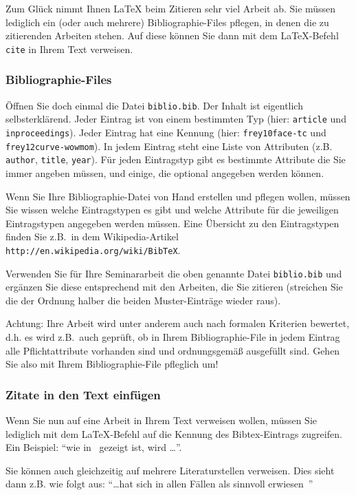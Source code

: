 \documentclass[a4paper,twoside]{IEEEtran}
\begin{document}
Zum Glück nimmt Ihnen LaTeX beim Zitieren sehr viel Arbeit ab. Sie müssen lediglich ein (oder auch mehrere) Bibliographie-Files pflegen, in denen die zu zitierenden Arbeiten stehen. Auf diese können Sie dann mit dem LaTeX-Befehl \texttt{cite} in Ihrem Text verweisen.

\subsubsection{Bibliographie-Files}

Öffnen Sie doch einmal die Datei \texttt{biblio.bib}. Der Inhalt ist eigentlich selbsterklärend. Jeder Eintrag ist von einem bestimmten Typ (hier: \texttt{article} und \texttt{inproceedings}). Jeder Eintrag hat eine Kennung (hier: \texttt{frey10face-tc} und \texttt{frey12curve-wowmom}). In jedem Eintrag steht eine Liste von Attributen (z.B. \texttt{author}, \texttt{title}, \texttt{year}). Für jeden Eintragstyp gibt es bestimmte Attribute die Sie immer angeben müssen, und einige, die optional angegeben werden können.

Wenn Sie Ihre Bibliographie-Datei von Hand erstellen und pflegen wollen, müssen Sie wissen welche Eintragstypen es gibt und welche Attribute für die jeweiligen Eintragstypen angegeben werden müssen. Eine Übersicht zu den Eintragstypen finden Sie z.B.\ in dem Wikipedia-Artikel \texttt{http://en.wikipedia.org/wiki/BibTeX}.

Verwenden Sie für Ihre Seminararbeit die oben genannte Datei \texttt{biblio.bib} und ergänzen Sie diese entsprechend mit den Arbeiten, die Sie zitieren (streichen Sie die der Ordnung halber die beiden Muster-Einträge wieder raus).

Achtung: Ihre Arbeit wird unter anderem auch nach formalen Kriterien bewertet, d.h. es wird z.B.\ auch geprüft, ob in Ihrem Bibliographie-File in jedem Eintrag alle Pflichtattribute vorhanden sind und ordnungsgemäß ausgefüllt sind. Gehen Sie also mit Ihrem Bibliographie-File pfleglich um!

\subsubsection{Zitate in den Text einfügen}

Wenn Sie nun auf eine Arbeit in Ihrem Text verweisen wollen, müssen Sie lediglich mit dem LaTeX-Befehl auf die Kennung des Bibtex-Eintrags zugreifen. Ein Beispiel: "`wie in~\cite{frey10face-tc} gezeigt ist, wird \dots"'.

Sie können auch gleichzeitig auf mehrere Literaturstellen verweisen. Dies sieht dann z.B. wie folgt aus: "`\dots hat sich in allen Fällen als sinnvoll erwiesen~\cite{frey10face-tc, frey12curve-wowmom}"'
\end{document}
